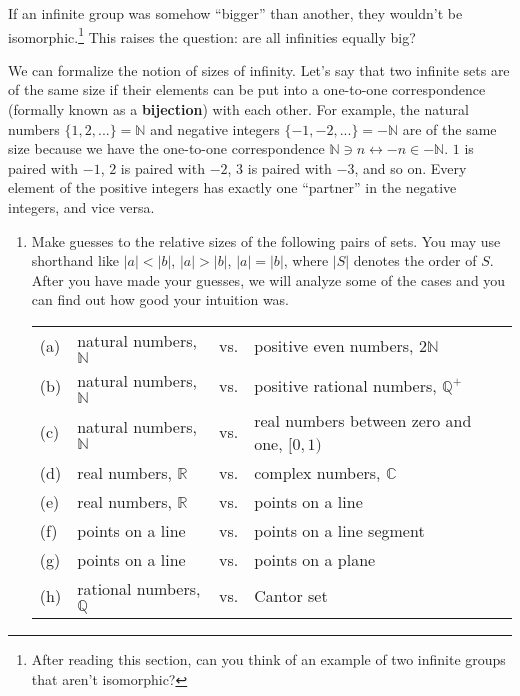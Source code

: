 \documentclass[../textbook.tex]{subfiles}
\begin{document}
\noindent If an infinite group was somehow ``bigger'' than another, they wouldn't be isomorphic.\footnote{After reading this section, can you think of an example of two infinite groups that aren't isomorphic?} This raises the question: are all infinities equally big?

We can formalize the notion of sizes of infinity. Let's say that two infinite sets are of the same size if their elements can be put into a one-to-one correspondence (formally known as a \textbf{bijection}) with each other. For example, the natural numbers $\{1,2,...\}=\mathbb{N}$ and negative integers $\{-1,-2,...\}=-\mathbb{N}$ are of the same size because we have the one-to-one correspondence $\mathbb{N} \ni n\leftrightarrow -n \in -\mathbb{N}$. $1$ is paired with $-1$, $2$ is paired with $-2$, $3$ is paired with $-3$, and so on. Every element of the positive integers has exactly one ``partner'' in the negative integers, and vice versa.

\begin{enumerate}
\setcounter{enumi}{\value{problem_i}}
\item Make guesses to the relative sizes of the following pairs of sets. You may use shorthand like $|a| < |b|$, $|a| > |b|$, $|a| = |b|$, where $|S|$ denotes the order of $S$. After you have made your guesses, we will analyze some of the cases and you can find out how good your intuition was.~\label{prob:infinity_guesses}

\begin{tabular}{llll} %
(a) & natural numbers, $\mathbb{N}$ & vs. & positive even numbers, $2\mathbb{N}$ \\
(b) & natural numbers, $\mathbb{N}$ & vs. & positive rational numbers, $\mathbb{Q}^+$ \\
(c) & natural numbers, $\mathbb{N}$ & vs. & real numbers between zero and one, $[0,1)$ \\
(d) & real numbers, $\mathbb{R}$ & vs. & complex numbers, $\mathbb{C}$ \\
(e) & real numbers, $\mathbb{R}$ & vs. & points on a line \\
(f) & points on a line & vs. & points on a line segment \\
(g) & points on a line & vs. & points on a plane \\
(h) & rational numbers, $\mathbb{Q}$ & vs. & Cantor set\footnotemark
\end{tabular}

\setcounter{problem_i}{\value{enumi}}
\end{enumerate}
\end{document}

